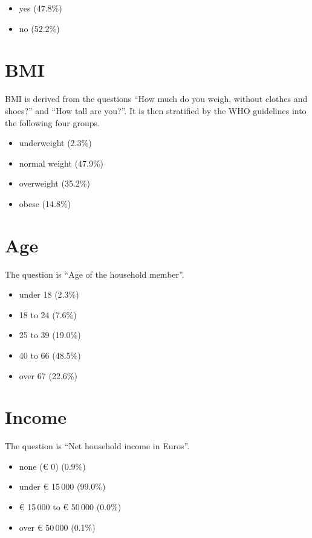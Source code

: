 \begin{itemize}[nolistsep]
    \item yes (47.8\%)
    \item no (52.2\%)
\end{itemize}

\section*{BMI}
BMI is derived from the questions ``How much do you weigh, without clothes and shoes?'' and ``How tall are you?''.
It is then stratified by the WHO guidelines \cite{who_healthy_lifestyle_2010} into the following four groups.

\begin{itemize}[nolistsep]
    \item underweight (2.3\%)
    \item normal weight (47.9\%)
    \item overweight (35.2\%)
    \item obese (14.8\%)
\end{itemize}

\section*{Age}
The question is ``Age of the household member''.

\begin{itemize}[nolistsep]
    \item under 18 (2.3\%)
    \item 18 to 24 (7.6\%)
    \item 25 to 39 (19.0\%)
    \item 40 to 66 (48.5\%)
    \item over 67 (22.6\%)
\end{itemize}

\section*{Income}
The question is ``Net household income in Euros''.

\begin{itemize}[nolistsep]
    \item none (€ 0) (0.9\%)
    \item under € 15\,000 (99.0\%)
    \item € 15\,000 to € 50\,000 (0.0\%)
    \item over € 50\,000 (0.1\%)
\end{itemize}

